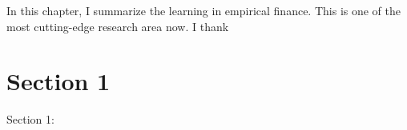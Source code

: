 \minitoc

\vspace{0.5cm}

In this chapter, I summarize the learning in empirical finance.
This is one of the most cutting-edge research area now. I thank

\section{Section 1}
Section 1: